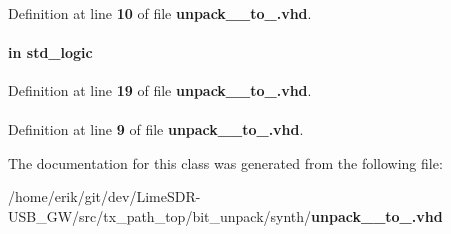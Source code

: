 \paragraph[{numeric\+\_\+std}]{\hspace{0.3cm}{\ttfamily [Package]}}\label{classunpack__64__to__56_a2edc34402b573437d5f25fa90ba4013e}


Definition at line {\bf 10} of file {\bf unpack\+\_\+\_\+to\+\_.\+vhd}.

\paragraph[{reset\+\_\+n}]{ {\bfseries \textcolor{keywordflow}{in}\textcolor{vhdlchar}{ }} {\bfseries \textcolor{comment}{std\+\_\+logic}\textcolor{vhdlchar}{ }} \hspace{0.3cm}{\ttfamily [Port]}}\label{classunpack__64__to__56_a446ea52ed8c4a84181a47d9165ce41a5}


Definition at line {\bf 19} of file {\bf unpack\+\_\+\_\+to\+\_.\+vhd}.

\paragraph[{std\+\_\+logic\+\_\+1164}]{\hspace{0.3cm}{\ttfamily [Package]}}\label{classunpack__64__to__56_acd03516902501cd1c7296a98e22c6fcb}


Definition at line {\bf 9} of file {\bf unpack\+\_\+\_\+to\+\_.\+vhd}.



The documentation for this class was generated from the following file\+:\begin{DoxyCompactItemize}
\item 
/home/erik/git/dev/\+Lime\+S\+D\+R-\/\+U\+S\+B\+\_\+\+G\+W/src/tx\+\_\+path\+\_\+top/bit\+\_\+unpack/synth/{\bf unpack\+\_\+\_\+to\+\_.\+vhd}\end{DoxyCompactItemize}
